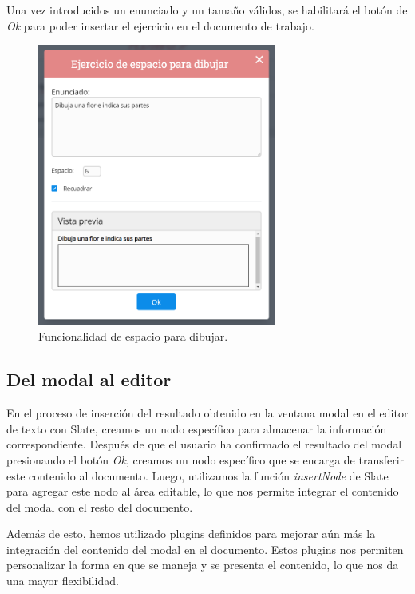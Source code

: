 Una vez introducidos un enunciado y un tamaño válidos, se habilitará el botón de \textit{Ok} para poder insertar el ejercicio en el documento de trabajo.


\begin{figure}[ht!]
  \centering
  \includegraphics[width=0.7\textwidth]{Imagenes/Funcionalidades/EspacioParaDibujar.PNG}
  \caption{Funcionalidad de espacio para dibujar.}
  \label{fig:funcionalidadEspacioParaDibujar}
\end{figure}



\subsection{Del modal al editor}
En el proceso de inserción del resultado obtenido en la ventana modal en el editor de texto con Slate, creamos un nodo específico para almacenar la información correspondiente. Después de que el usuario ha confirmado el resultado del modal presionando el botón \textit{Ok}, creamos un nodo específico que se encarga de transferir este contenido al documento. Luego, utilizamos la función \textit{insertNode} de Slate para agregar este nodo al área editable, lo que nos permite integrar el contenido del modal con el resto del documento.

Además de esto, hemos utilizado plugins definidos para mejorar aún más la integración del contenido del modal en el documento. Estos plugins nos permiten personalizar la forma en que se maneja y se presenta el contenido, lo que nos da una mayor flexibilidad.

